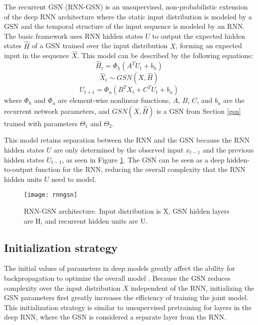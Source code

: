 The recurrent GSN (RNN-GSN) is an unsupervised, non-probabilistic extension of the deep RNN architecture where the static input distribution is modeled by a GSN and the temporal structure of the input sequence is modeled by an RNN. The basic framework uses RNN hidden states $U$ to output the expected hidden states $\hat{H}$ of a GSN trained over the input distribution $X$, forming an expected input in the sequence $\hat{X}$. This model can be described by the following equations:
\begin{equation}
	\hat{H}_t = \Phi_{h}(A^TU_{t} + b_h)
\end{equation}
\begin{equation}
	\hat{X}_t \sim GSN(X,\hat{H})
\end{equation}
\begin{equation}
	U_{t+1} = \Phi_{u}(B^TX_t + C^TU_t + b_u)
\end{equation}
where \(\Phi_h\) and \(\Phi_u\) are element-wise nonlinear functions,  $A$, $B$, $C$, and $b_u$ are the recurrent network parameters, and $GSN(X,\hat{H})$ is a GSN from Section \ref{gsn} trained with parameters $\Theta_1$ and $\Theta_2$.

This model retains separation between the RNN and the GSN because the RNN hidden states $U$ are only determined by the observed input $x_{t-1}$ and the previous hidden states $U_{t-1}$, as seen in Figure \ref{fig:rnngsn1}. The GSN can be seen as a deep hidden-to-output function for the RNN, reducing the overall complexity that the RNN hidden units $U$ need to model.

\begin{figure}[h!]
  \centering
    \texttt{[image: rnngsn]}
\caption{RNN-GSN architecture. Input distribution is X, GSN hidden layers are H, and recurrent hidden units are U.}\label{fig:rnngsn1} 
\end{figure}

\subsection{Initialization strategy}
The initial values of parameters in deep models greatly affect the ability for backpropagation to optimize the overall model \cite{bengio09,initialization}. Because the GSN reduces complexity over the input distribution $X$ independent of the RNN, initializing the GSN parameters first greatly increases the efficiency of training the joint model. This initialization strategy is similar to unsupervised pretraining for layers in the deep RNN, where the GSN is considered a separate layer from the RNN.

